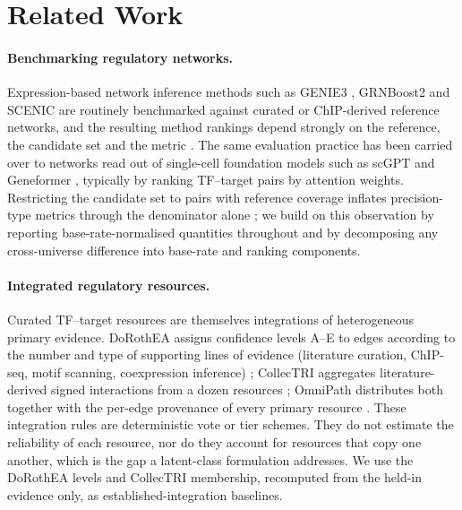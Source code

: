 \section{Related Work}\label{sec:related}

\paragraph{Benchmarking regulatory networks.}
Expression-based network inference methods such as GENIE3 \citep{huynh2010inferring}, GRNBoost2 \citep{moerman2019grnboost2} and SCENIC \citep{aibar2017scenic} are routinely benchmarked against curated or ChIP-derived reference networks, and the resulting method rankings depend strongly on the reference, the candidate set and the metric \citep{pratapa2020benchmarking}.
The same evaluation practice has been carried over to networks read out of single-cell foundation models such as scGPT \citep{cui2024scgpt} and Geneformer \citep{theodoris2023transfer}, typically by ranking TF--target pairs by attention weights.
Restricting the candidate set to pairs with reference coverage inflates precision-type metrics through the denominator alone \citep{kendiukhov2025universe}; we build on this observation by reporting base-rate-normalised quantities throughout and by decomposing any cross-universe difference into base-rate and ranking components.

\paragraph{Integrated regulatory resources.}
Curated TF--target resources are themselves integrations of heterogeneous primary evidence. DoRothEA assigns confidence levels A--E to edges according to the number and type of supporting lines of evidence (literature curation, ChIP-seq, motif scanning, coexpression inference) \citep{garcia2019benchmark}; CollecTRI aggregates literature-derived signed interactions from a dozen resources \citep{mullerdott2023collectri}; OmniPath distributes both together with the per-edge provenance of every primary resource \citep{turei2021omnipath}.
These integration rules are deterministic vote or tier schemes. They do not estimate the reliability of each resource, nor do they account for resources that copy one another, which is the gap a latent-class formulation addresses. We use the DoRothEA levels and CollecTRI membership, recomputed from the held-in evidence only, as established-integration baselines.

